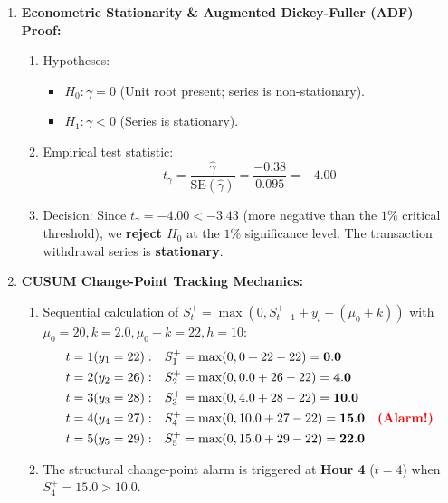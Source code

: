 \begin{enumerate}[label=\textbf{P10.\arabic*}]
    \item \textbf{Econometric Stationarity \& Augmented Dickey-Fuller (ADF) Proof:}
    \begin{enumerate}[label=(\alph*)]
        \item Hypotheses:
        \begin{itemize}
            \item $H_0: \gamma = 0$ (Unit root present; series is non-stationary).
            \item $H_1: \gamma < 0$ (Series is stationary).
        \end{itemize}
        \item Empirical test statistic:
        \begin{equation*}
        t_\gamma = \frac{\hat{\gamma}}{\text{SE}(\hat{\gamma})} = \frac{-0.38}{0.095} = \mathbf{-4.00}
        \end{equation*}
        \item Decision: Since $t_\gamma = -4.00 < -3.43$ (more negative than the $1\%$ critical threshold), we \textbf{reject $H_0$} at the $1\%$ significance level. The transaction withdrawal series is \textbf{stationary}.
    \end{enumerate}

    \item \textbf{CUSUM Change-Point Tracking Mechanics:}
    \begin{enumerate}[label=(\alph*)]
        \item Sequential calculation of $S_t^+ = \max(0, S_{t-1}^+ + y_t - (\mu_0 + k))$ with $\mu_0 = 20, k = 2.0, \mu_0 + k = 22, h = 10$:
        \begin{align*}
        t=1 (y_1=22): &\quad S_1^+ = \max(0, 0 + 22 - 22) = \mathbf{0.0} \\
        t=2 (y_2=26): &\quad S_2^+ = \max(0, 0.0 + 26 - 22) = \mathbf{4.0} \\
        t=3 (y_3=28): &\quad S_3^+ = \max(0, 4.0 + 28 - 22) = \mathbf{10.0} \\
        t=4 (y_4=27): &\quad S_4^+ = \max(0, 10.0 + 27 - 22) = \mathbf{15.0} \quad \text{\textcolor{red}{\textbf{(Alarm!)}}} \\
        t=5 (y_5=29): &\quad S_5^+ = \max(0, 15.0 + 29 - 22) = \mathbf{22.0}
        \end{align*}
        \item The structural change-point alarm is triggered at \textbf{Hour 4} ($t = 4$) when $S_4^+ = 15.0 > 10.0$.
    \end{enumerate}


\end{enumerate}
